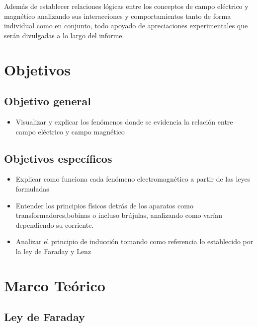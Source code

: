 \documentclass[twocolumn, 12pt]{article}
\begin{document}
Además de establecer relaciones lógicas entre los conceptos
de campo eléctrico y magnético analizando sus interacciones
y comportamientos tanto de forma individual como en
conjunto, todo apoyado de apreciaciones experimentales que
serán divulgadas a lo largo del informe.

\section{Objetivos}

\subsection*{Objetivo general}

\begin{itemize}[label=$\triangleright$]
	\item Visualizar y explicar los fenómenos donde se evidencia la
	      relación entre campo eléctrico y campo magnético
\end{itemize}

\subsection*{Objetivos específicos}

\begin{itemize}[label=$\triangleright$]
	\item Explicar como funciona cada fenómeno electromagnético a
	      partir de las leyes formuladas
	\item Entender los principios físicos detrás de los aparatos como
	      transformadores,bobinas o incluso brújulas, analizando como
	      varían dependiendo su corriente.
	\item Analizar el principio de inducción tomando como referencia
	      lo establecido por la ley de Faraday y Lenz
\end{itemize}

\section{Marco Teórico}

\subsection*{Ley de Faraday}
\end{document}
